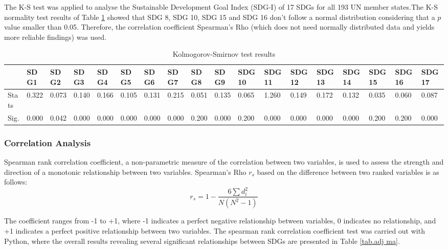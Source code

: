 \documentclass[10pt]{mcmthesis}
\begin{document}
The K-S test was applied to analyse the Sustainable Development Goal Index (SDG-I) of 17 SDGs for all 193 UN member states.The K-S normality test results of Table \ref{tab.Kolmogorov-Smirnov} showed that SDG 8, SDG 10, SDG 15 and SDG 16 don't follow a normal distribution considering that a $p$ value smaller than 0.05. Therefore, the correlation coefficient Spearman's Rho (which does not need normally distributed data and yields more reliable findings) was used.
\begin{table}[h]\caption{ Kolmogorov-Smirnov test results}
\tiny
\centering
\label{tab.Kolmogorov-Smirnov}
\tabcolsep=0.1cm
\begin{tabular}{llllllllllllllllll}
\hline
      & SDG1  & SDG2  & SDG3  & SDG4  & SDG5  & SDG6  & SDG7  & SDG8  & SDG9  & SDG10 & SDG11 & SDG12 & SDG13 & SDG14 & SDG15 & SDG16 & SDG17 \\ \hline
Stats & 0.322 & 0.073 & 0.140 & 0.166 & 0.105 & 0.131 & 0.215 & 0.051 & 0.135 & 0.065 & 1.260 & 0.149 & 0.172 & 0.132 & 0.035 & 0.060 & 0.087 \\ \hline
Sig.  & 0.000 & 0.042 & 0.000 & 0.000 & 0.000 & 0.000 & 0.000 & 0.200 & 0.000 & 0.200 & 0.000 & 0.000 & 0.000 & 0.000 & 0.200 & 0.200 & 0.000 \\ \hline
\end{tabular}
\end{table}


\subsubsection{Correlation Analysis  }
Spearman rank correlation coefficient, a non-parametric measure of the correlation between two variables, is used to assess the strength and direction of a monotonic relationship between two variables. Spearman's Rho $r_s$ based on the difference between two ranked variables is as follows:
\begin{equation}
r_s=1-\frac{6 \sum d_i^2}{N\left(N^2-1\right)}
\end{equation}


The coefficient ranges from -1 to +1, where -1 indicates a perfect negative relationship between variables, 0 indicates no relationship, and +1 indicates a perfect positive relationship between two variables. The spearman rank correlation coefficient test was carried out with Python, where the overall results revealing several significant relationships between SDGs are presented in Table \ref{tab.adj ma}.
\end{document}
